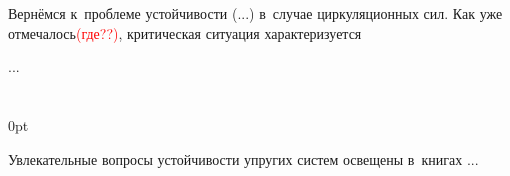 

\begin{otherlanguage}{russian}

Вернёмся к~проблеме устойчивости (...) в~случае циркуляционных сил.
Как уже отмечалось\textcolor{red}{(где??)}, критическая ситуация характеризуется

...



\end{otherlanguage}

\section*{\small \wordforbibliography}

\begin{changemargin}{\parindent}{0pt}
\fontsize{10}{12}\selectfont

\begin{otherlanguage}{russian}

Увлекательные вопросы устойчивости упругих систем освещены в~книгах ...

\end{otherlanguage}

\end{changemargin}
